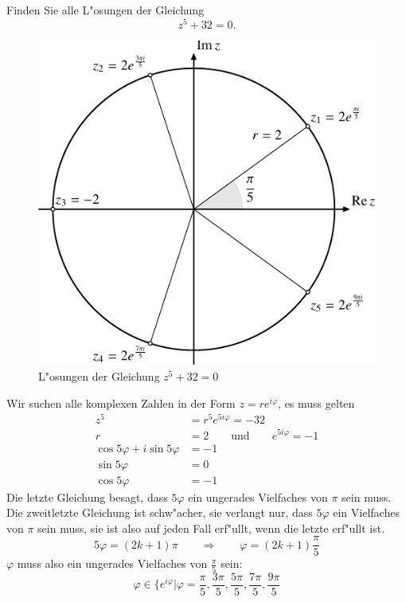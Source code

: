 Finden Sie alle L"osungen der Gleichung
\[
z^5+32=0.
\]

\begin{loesung}
\begin{figure}
\centering
\includegraphics{uebungsaufgaben/exercise-1.pdf}
\caption{L"osungen der Gleichung $z^5+32=0$
\label{skript:15006:loesungen}}
\end{figure}
Wir suchen alle komplexen Zahlen in der Form $z=re^{i\varphi}$, es muss gelten
\begin{align*}
z^5&=r^5e^{5i\varphi}=-32
\\
r&=2\qquad\text{und}\qquad e^{5i\varphi}=-1
\\
\cos 5\varphi+i\sin 5\varphi&=-1
\\
\sin 5\varphi&=0
\\
\cos 5\varphi&=-1
\end{align*}
Die letzte Gleichung besagt, dass $5\varphi$ ein ungerades Vielfaches von
$\pi$ sein muss. Die zweitletzte Gleichung ist schw"acher, sie verlangt
nur, dass $5\varphi$ ein Vielfaches von $\pi$ sein muss, sie ist also
auf jeden Fall erf"ullt, wenn die letzte erf"ullt ist.
\[
5\varphi=(2k+1)\pi
\qquad\Rightarrow\qquad
\varphi=(2k+1)\frac{\pi}5
\]
$\varphi$ muss also ein ungerades Vielfaches von $\frac{\pi}5$ sein:
\[
\varphi\in\biggl\{
e^{i\varphi}\bigg|
\varphi
=
\frac{\pi}{5},
\frac{3\pi}{5},
\frac{5\pi}{5},
\frac{7\pi}{5},
\frac{9\pi}{5}
\]
\end{loesung}
